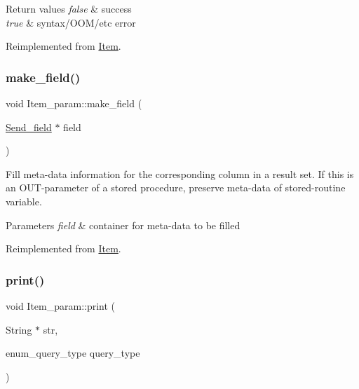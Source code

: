 \begin{DoxyRetVals}{Return values}
{\em false} & success \\
\hline
{\em true} & syntax/\+O\+O\+M/etc error \\
\hline
\end{DoxyRetVals}


Reimplemented from \mbox{\hyperlink{classItem_a0757839d09aa77bfd92bfe071f257ae9}{Item}}.

\mbox{\label{classItem__param_a4183b97dead39d749539f3fd7430f10d}} 
\subsubsection{\texorpdfstring{make\+\_\+field()}{make\_field()}}
{\footnotesize\ttfamily void Item\+\_\+param\+::make\+\_\+field (\begin{DoxyParamCaption}\item[{\mbox{\hyperlink{classSend__field}{Send\+\_\+field}} $\ast$}]{field }\end{DoxyParamCaption})\hspace{0.3cm}{\ttfamily [virtual]}}

Fill meta-\/data information for the corresponding column in a result set. If this is an O\+UT-\/parameter of a stored procedure, preserve meta-\/data of stored-\/routine variable.


\begin{DoxyParams}{Parameters}
{\em field} & container for meta-\/data to be filled \\
\hline
\end{DoxyParams}


Reimplemented from \mbox{\hyperlink{classItem}{Item}}.

\mbox{\label{classItem__param_a924859217c703dcca71af233e6d3548a}} 
\subsubsection{\texorpdfstring{print()}{print()}}
{\footnotesize\ttfamily void Item\+\_\+param\+::print (\begin{DoxyParamCaption}\item[{String $\ast$}]{str,  }\item[{enum\+\_\+query\+\_\+type}]{query\+\_\+type }\end{DoxyParamCaption})\hspace{0.3cm}{\ttfamily [virtual]}}

